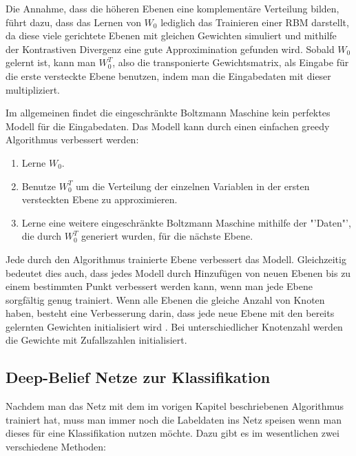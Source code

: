 \documentclass[12pt]{article}
\begin{document}
Die Annahme, dass die höheren Ebenen eine komplementäre Verteilung bilden, führt dazu, dass das Lernen von $W_0$ lediglich das Trainieren einer RBM darstellt, da diese viele gerichtete Ebenen mit gleichen Gewichten simuliert und mithilfe der Kontrastiven Divergenz  eine gute Approximination gefunden wird. Sobald $W_0$ gelernt ist, kann man $W^T_0$, also die transponierte Gewichtsmatrix, als Eingabe für die erste versteckte Ebene benutzen, indem man die Eingabedaten mit dieser multipliziert.

Im allgemeinen findet die eingeschränkte Boltzmann Maschine kein perfektes Modell für die Eingabedaten. Das Modell kann durch einen einfachen greedy Algorithmus verbessert werden:
 
\begin{enumerate}
\item Lerne $W_0$.
\item Benutze $W_0^T$ um die Verteilung der einzelnen Variablen in der ersten versteckten Ebene zu approximieren.
\item Lerne eine weitere eingeschränkte Boltzmann Maschine  mithilfe der "'Daten"', die durch $W_0^T$ generiert wurden, für die nächste Ebene.
\end{enumerate}



Jede durch den Algorithmus trainierte Ebene verbessert das Modell. Gleichzeitig bedeutet dies auch, dass jedes Modell durch Hinzufügen von neuen Ebenen bis zu einem bestimmten Punkt verbessert werden kann, wenn man jede Ebene sorgfältig genug trainiert. Wenn alle Ebenen die gleiche Anzahl von Knoten haben, besteht eine Verbesserung darin, dass jede neue Ebene mit den bereits gelernten Gewichten initialisiert wird \cite{learning}. Bei unterschiedlicher Knotenzahl werden die Gewichte mit Zufallszahlen initialisiert.

\subsection{Deep-Belief Netze zur Klassifikation}
Nachdem man das Netz mit dem im vorigen Kapitel beschriebenen Algorithmus trainiert hat, muss man immer noch die Labeldaten ins Netz speisen wenn man dieses für eine Klassifikation nutzen möchte. Dazu gibt es im wesentlichen zwei verschiedene Methoden:
\end{document}
